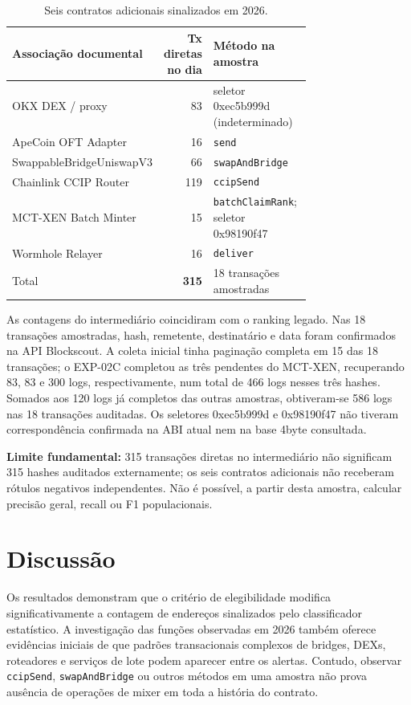 \documentclass[11pt,a4paper]{article}
\begin{document}
\begin{table}[htbp]
\centering
\small
\caption{Seis contratos adicionais sinalizados em 2026.}
\label{tab:contratos}
\begin{tabular}{p{0.39\linewidth}rp{0.35\linewidth}}
\toprule
Associação documental & Tx diretas no dia & Método na amostra\\
\midrule
OKX DEX / proxy & 83 & seletor 0xec5b999d (indeterminado)\\
ApeCoin OFT Adapter & 16 & \texttt{send}\\
SwappableBridgeUniswapV3 & 66 & \texttt{swapAndBridge}\\
Chainlink CCIP Router & 119 & \texttt{ccipSend}\\
MCT-XEN Batch Minter & 15 & \texttt{batchClaimRank}; seletor 0x98190f47\\
Wormhole Relayer & 16 & \texttt{deliver}\\
\midrule
Total & \textbf{315} & 18 transações amostradas\\
\bottomrule
\end{tabular}
\end{table}

As contagens do intermediário coincidiram com o ranking legado. Nas 18 transações amostradas, hash, remetente, destinatário e data foram confirmados na API Blockscout. A coleta inicial tinha paginação completa em 15 das 18 transações; o EXP-02C completou as três pendentes do MCT-XEN, recuperando 83, 83 e 300 logs, respectivamente, num total de 466 logs nesses três hashes. Somados aos 120 logs já completos das outras amostras, obtiveram-se 586 logs nas 18 transações auditadas. Os seletores 0xec5b999d e 0x98190f47 não tiveram correspondência confirmada na ABI atual nem na base 4byte consultada.

\textbf{Limite fundamental:} 315 transações diretas no intermediário não significam 315 hashes auditados externamente; os seis contratos adicionais não receberam rótulos negativos independentes. Não é possível, a partir desta amostra, calcular precisão geral, recall ou F1 populacionais.

\section{Discussão}
Os resultados demonstram que o critério de elegibilidade modifica significativamente a contagem de endereços sinalizados pelo classificador estatístico. A investigação das funções observadas em 2026 também oferece evidências iniciais de que padrões transacionais complexos de bridges, DEXs, roteadores e serviços de lote podem aparecer entre os alertas. Contudo, observar \texttt{ccipSend}, \texttt{swapAndBridge} ou outros métodos em uma amostra não prova ausência de operações de mixer em toda a história do contrato.
\end{document}
